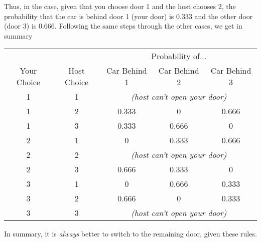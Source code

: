 Thus, in the case, given that you choose door 1 and the host chooses 2, the probability that the car is behind door 1 (your door) is 0.333 and the other door (door 3) is 0.666.  Following the same steps through the other cases, we get in summary
\begin{center}
\begin{tabular}{ccccc}
& & \multicolumn{3}{|c|}{Probability of...} \\
Your Choice & Host Choice & Car Behind 1 & Car Behind 2 & Car Behind 3 \\\hline
1 & 1 & \multicolumn{3}{c}{\emph{(host can't open your door)}} \\
1 & 2 & 0.333 & 0 & 0.666 \\
1 & 3 & 0.333  & 0.666 & 0\\\hline
2 & 1 &  0 &0.333 & 0.666 \\
2 & 2 & \multicolumn{3}{c}{\emph{(host can't open your door)}} \\
2 & 3 &   0.666 & 0.333 & 0  \\\hline
3 & 1 & 0 & 0.666 & 0.333 \\
3 & 2  & 0.666 & 0 & 0.333\\
3 & 3 & \multicolumn{3}{c}{\emph{(host can't open your door)}}
\end{tabular}
\end{center}

In summary, it is \emph{always} better to switch to the remaining door, given these rules.

